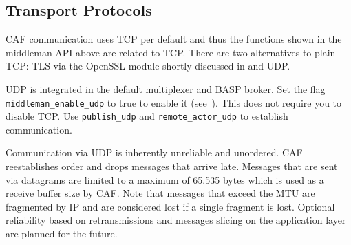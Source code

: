 \subsection{Transport Protocols \experimental}
\label{transport-protocols}

CAF communication uses TCP per default and thus the functions shown in the
middleman API above are related to TCP. There are two alternatives to plain
TCP: TLS via the OpenSSL module shortly discussed in
 and UDP.

UDP is integrated in the default multiplexer and BASP broker. Set the flag
\lstinline^middleman_enable_udp^ to true to enable it
(see~). This does not require you to disable TCP. Use
\lstinline^publish_udp^ and \lstinline^remote_actor_udp^ to establish
communication.

Communication via UDP is inherently unreliable and unordered. CAF reestablishes
order and drops messages that arrive late. Messages that are sent via datagrams
are limited to a maximum of 65.535 bytes which is used as a receive buffer size
by CAF. Note that messages that exceed the MTU are fragmented by IP and are
considered lost if a single fragment is lost. Optional reliability based on
retransmissions and messages slicing on the application layer are planned for
the future.
